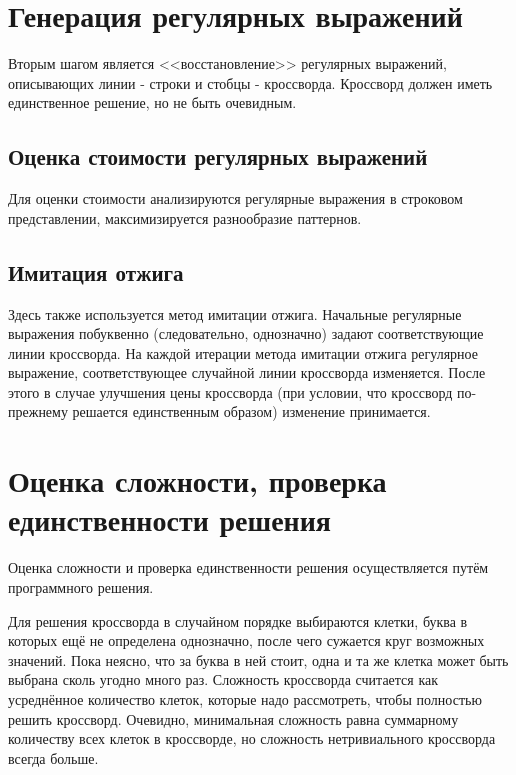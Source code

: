 \documentclass[12pt]{report}
\begin{document}
\section{Генерация регулярных выражений}
Вторым шагом является <<восстановление>> регулярных выражений, описывающих линии - строки и стобцы - кроссворда. Кроссворд должен иметь единственное решение, но не быть очевидным.

\subsection{Оценка стоимости регулярных выражений}
Для оценки стоимости анализируются регулярные выражения в строковом представлении, максимизируется разнообразие паттернов. %

\subsection{Имитация отжига}
Здесь  также используется метод имитации отжига. Начальные регулярные выражения побуквенно (следовательно, однозначно) задают соответствующие линии кроссворда. На каждой итерации метода имитации отжига регулярное выражение, соответствующее случайной линии кроссворда изменяется. После этого в случае улучшения цены кроссворда (при условии, что кроссворд по-прежнему решается единственным образом) изменение принимается.


\section{Оценка сложности, проверка единственности решения}
Оценка сложности и проверка единственности решения осуществляется путём программного решения.

Для решения кроссворда в случайном порядке выбираются клетки, буква в которых ещё не определена однозначно, после чего сужается круг возможных значений. Пока неясно, что за буква в ней стоит, одна и та же клетка может быть выбрана сколь угодно много раз. Сложность кроссворда считается как усреднённое количество клеток, которые надо рассмотреть, чтобы полностью решить кроссворд. Очевидно, минимальная сложность равна суммарному количеству всех клеток в кроссворде, но сложность нетривиального кроссворда всегда больше.


    \newpage %
\end{document}

